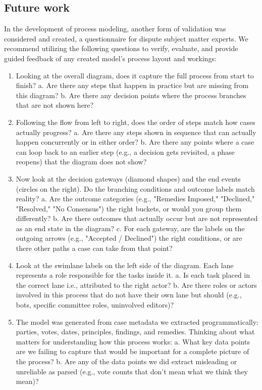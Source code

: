 \documentclass[conference]{IEEEtran}
\begin{document}
\subsection{Future work}
In the development of process modeling, another form of validation was considered and created, a questionnaire for dispute subject matter experts. We recommend utilizing the following questions to verify, evaluate, and provide guided feedback of any created model's process layout and workings:
\begin{enumerate}
    \item Looking at the overall diagram, does it capture the full process from start to finish?
    a. Are there any steps that happen in practice but are missing from this diagram?
    b. Are there any decision points where the process branches that are not shown here?
    \item Following the flow from left to right, does the order of steps match how cases actually progress?
    a. Are there any steps shown in sequence that can actually happen concurrently or in either order?
    b. Are there any points where a case can loop back to an earlier step (e.g., a decision gets revisited, a phase reopens) that the diagram does not show?
    \item Now look at the decision gateways (diamond shapes) and the end events (circles on the right). Do the branching conditions and outcome labels match reality?
    a. Are the outcome categories (e.g., "Remedies Imposed," "Declined," "Resolved," "No Consensus") the right buckets, or would you group them differently?
    b. Are there outcomes that actually occur but are not represented as an end state in the diagram?
    c. For each gateway, are the labels on the outgoing arrows (e.g., "Accepted / Declined") the right conditions, or are there other paths a case can take from that point?
    \item Look at the swimlane labels on the left side of the diagram. Each lane represents a role responsible for the tasks inside it.
    a. Is each task placed in the correct lane i.e., attributed to the right actor? b. Are there roles or actors involved in this process that do not have their own lane but should (e.g., bots, specific committee roles, uninvolved editors)?
    \item The model was generated from case metadata we extracted programmatically: parties, votes, dates, principles, findings, and remedies. Thinking about what matters for understanding how this process works:
    a. What key data points are we failing to capture that would be important for a complete picture of the process? b. Are any of the data points we did extract misleading or unreliable as parsed (e.g., vote counts that don't mean what we think they mean)?
\end{enumerate}
\end{document}
